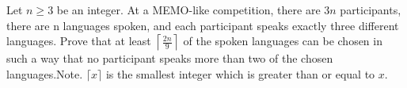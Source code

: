 Let $n \geq 3$ be an integer. At a MEMO-like competition, there are $3n$ participants, there are n languages spoken, and each participant speaks exactly three different languages. Prove that at least $\left\lceil\frac{2n}{9}\right\rceil$ of the spoken languages can be chosen in such a way that no participant speaks more than two of the chosen languages.Note. $\lceil x\rceil$ is the smallest integer which is greater than or equal to $x$.